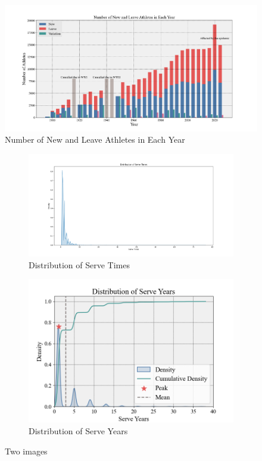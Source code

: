\documentclass[12pt]{article}  %
\begin{document}
\begin{figure}[htbp]
	\centering
	\includegraphics[width=12cm]{img/Number.png}
	\caption{Number of New and Leave Athletes in Each Year}
	\label{fig:aa}
\end{figure}

\begin{figure}[htbp]
	\centering
	\begin{subfigure}[b]{.55\textwidth}
		\includegraphics[width=\textwidth]{img/Times.png}
		\caption{Distribution of Serve Times}\label{subfig:left}
	\end{subfigure}
	\begin{subfigure}[b]{.4\textwidth}
		\includegraphics[width=\textwidth]{img/Years.png}
		\caption{Distribution of Serve Years}\label{subfig:right}
	\end{subfigure}
	\caption{Two images}\label{fig:subfigures}
\end{figure}
\end{document}
